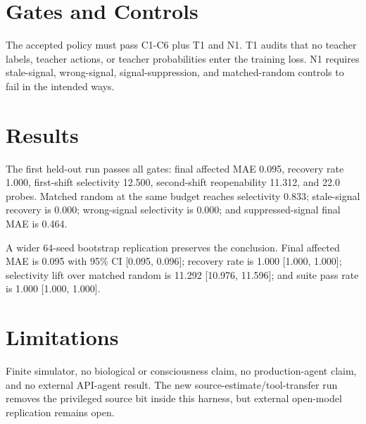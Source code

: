 \documentclass[10pt,twocolumn]{article}
\begin{document}
\section{Gates and Controls}
The accepted policy must pass C1-C6 plus T1 and N1. T1 audits that no teacher
labels, teacher actions, or teacher probabilities enter the training loss. N1
requires stale-signal, wrong-signal, signal-suppression, and matched-random
controls to fail in the intended ways.

\section{Results}
The first held-out run passes all gates: final affected MAE 0.095, recovery rate
1.000, first-shift selectivity 12.500, second-shift reopenability 11.312, and
22.0 probes. Matched random at the same budget reaches selectivity 0.833;
stale-signal recovery is 0.000; wrong-signal selectivity is 0.000; and
suppressed-signal final MAE is 0.464.

A wider 64-seed bootstrap replication preserves the conclusion. Final affected
MAE is 0.095 with 95\% CI [0.095, 0.096]; recovery rate is 1.000 [1.000,
1.000]; selectivity lift over matched random is 11.292 [10.976, 11.596]; and
suite pass rate is 1.000 [1.000, 1.000].

\section{Limitations}
Finite simulator, no biological or consciousness claim, no production-agent
claim, and no external API-agent result. The new source-estimate/tool-transfer
run removes the privileged source bit inside this harness, but external
open-model replication remains open.
\end{document}
